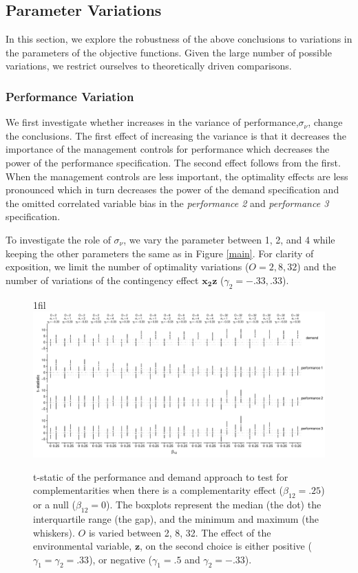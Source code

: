 \documentclass[12pt]{article}
\makeatletter
\newcommand*{\centerfloat}{%
  \parindent \z@
  \leftskip \z@ \@plus 1fil \@minus \textwidth
  \rightskip\leftskip
  \parfillskip \z@skip}
\makeatother
\begin{document}
\subsection{Parameter Variations}\label{parameter-variations}

In this section, we explore the robustness of the above conclusions to variations in the parameters of the objective functions. Given the large number of possible variations, we restrict ourselves to theoretically driven comparisons.

\subsubsection{Performance Variation}\label{performance-variation}

We first investigate whether increases in the variance of performance,\(\sigma_{\nu}\), change the conclusions. The first effect of increasing the variance is that it decreases the importance of the management controls for performance which decreases the power of the performance specification. The second effect follows from the first. When the management controls are less important, the optimality effects are less pronounced which in turn decreases the power of the demand specification and the omitted correlated variable bias in the \emph{performance 2} and \emph{performance 3} specification.

To investigate the role of \(\sigma_{\nu}\), we vary the parameter between 1, 2, and 4 while keeping the other parameters the same as in Figure \ref{main}. For clarity of exposition, we limit the number of optimality variations (\(O = 2, 8, 32\)) and the number of variations of the contingency effect \(\mathbf{x_2 z}\) (\(\gamma_2 = -.33, .33\)).


\begin{figure}
\centerfloat
\includegraphics[width=600px]{figure-latex/noise_plot.pdf}
\caption[Error Rate and Power with Increasing Levels of Variability in Performance]
{\label{noise} t-static of the performance and demand approach to test
for complementarities when there is a complementarity effect ($\beta_{12} = .25$)
or a null ($\beta_{12} = 0$). The boxplots represent the median (the dot) the
interquartile range (the gap), and the minimum and maximum (the whiskers). $O$
is varied between 2, 8, 32. The effect of the environmental
variable, $\mathbf{z}$, on the second choice is either positive
($\gamma_1 = \gamma_2 = .33$), or negative ($\gamma_1 = .5$ and $\gamma_2 = -.33$).}
\end{figure}
\end{document}
